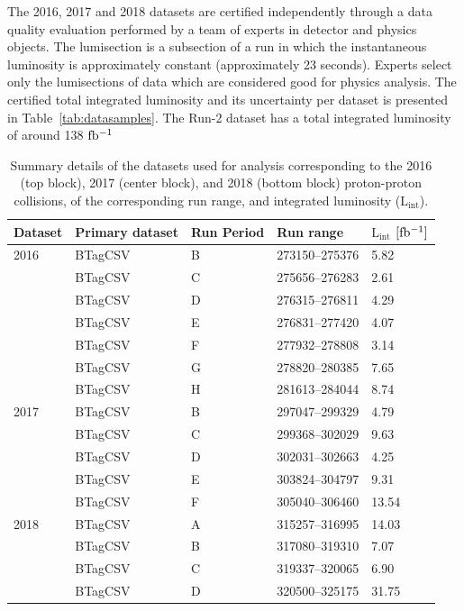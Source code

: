 The 2016, 2017 and 2018 datasets are certified independently through a data quality evaluation performed by a team of experts in detector and physics objects. The lumisection is a subsection of a run in which the instantaneous luminosity is approximately constant (approximately 23 seconds). Experts select only the lumisections of data which are considered good for physics analysis. The certified total integrated luminosity and its uncertainty per dataset is presented in Table~\ref{tab:datasamples}. The Run-2 dataset has a total integrated luminosity of around 138 $\mathrm{ fb^{-1} }$


\begin{table}[htb]
\centering
\small
\caption[Summary details of the datasets used for analysis]{\label{tab:dataperrun}Summary details of the datasets used for analysis corresponding to the 2016 (top block), 2017 (center block), and 2018 (bottom block) proton-proton collisions, of the corresponding run range, and integrated luminosity ($\mathrm{L_{int}}$).}
\begin{tabularx}{\textwidth}{XXXXX}
\hline
Dataset               & Primary dataset & Run Period  & Run range & $\mathrm{L_{int}}$ $[\mathrm{ fb^{-1} }]$\\
\hline
2016              & BTagCSV & B & 273150--275376 & 5.82\\
                  & BTagCSV & C & 275656--276283 & 2.61\\
                  & BTagCSV & D & 276315--276811 & 4.29\\
                  & BTagCSV & E & 276831--277420 & 4.07\\
                  & BTagCSV & F & 277932--278808 & 3.14\\
                  & BTagCSV & G & 278820--280385 & 7.65\\
                  & BTagCSV & H & 281613--284044 & 8.74\\
2017              & BTagCSV & B & 297047--299329 & 4.79 \\
                  & BTagCSV & C & 299368--302029 & 9.63 \\
                  & BTagCSV & D & 302031--302663 & 4.25 \\
                  & BTagCSV & E & 303824--304797 & 9.31 \\
                  & BTagCSV & F & 305040--306460 & 13.54\\
2018              & BTagCSV & A & 315257--316995 & 14.03\\
                  & BTagCSV & B & 317080--319310 & 7.07 \\
                  & BTagCSV & C & 319337--320065 & 6.90 \\
                  & BTagCSV & D & 320500--325175 & 31.75\\
\hline
\end{tabularx}
\end{table}

